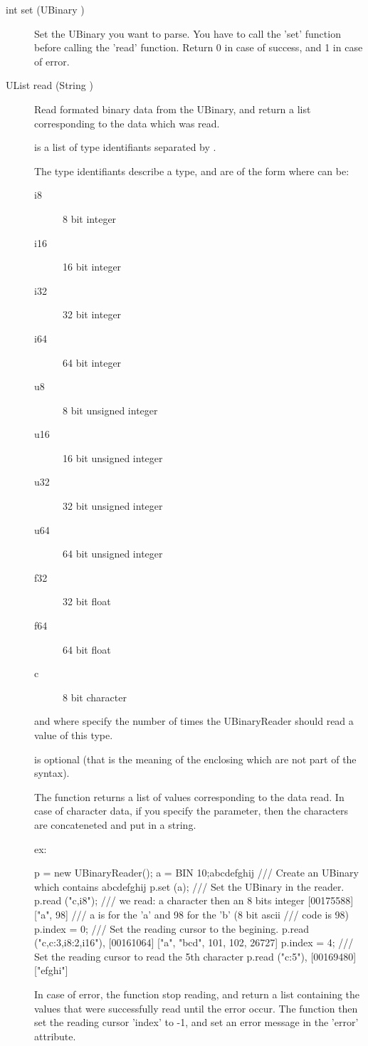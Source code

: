 \noindent
\begin{description}
\item[{int set (UBinary )}] Set the UBinary you want to
  parse. You have to call the 'set' function before calling the 'read'
  function.  Return 0 in case of success, and 1 in case of error.

\item[{UList read (String )}] Read formated binary data
  from the UBinary, and return a list corresponding to the data which
  was read.

   is a list of type identifiants separated by \samp{,}.

  The type identifiants describe a type, and are of the form
   where  can be:
  \begin{description}
  \item[i8]   8 bit integer
  \item[i16] 16 bit integer
  \item[i32] 32 bit integer
  \item[i64] 64 bit integer
  \item[u8]   8 bit unsigned integer
  \item[u16] 16 bit unsigned integer
  \item[u32] 32 bit unsigned integer
  \item[u64] 64 bit unsigned integer
  \item[f32] 32 bit float
  \item[f64] 64 bit float
  \item[c]    8 bit character
  \end{description}
  and where  specify the number of times the UBinaryReader
  should read a value of this type.

   is optional (that is the meaning of the enclosing \samp{[}
  \samp{]} which are not part of the syntax).

  The function returns a list of values corresponding to the data
  read.  In case of character data, if you specify the 
  parameter, then the characters are concateneted and put in a string.

  ex:
\begin{urbiunchecked}
p = new UBinaryReader();
a = BIN 10;abcdefghij   /// Create an UBinary which contains abcdefghij
p.set (a);              /// Set the UBinary in the reader.
p.read ("c,i8");        /// we read: a character then an 8 bits integer
[00175588] ["a", 98]    /// a is for the 'a' and 98 for the 'b' (8 bit ascii
                        /// code is 98)
p.index = 0;            /// Set the reading cursor to the begining.
p.read ("c,c:3,i8:2,i16"),
[00161064] ["a", "bcd", 101, 102, 26727]
p.index = 4;            /// Set the reading cursor to read the 5th character
p.read ("c:5"),
[00169480] ["efghi"]
\end{urbiunchecked}

  In case of error, the function stop reading, and return a list
  containing the values that were successfully read until the error
  occur. The function then set the reading cursor 'index' to -{}1, and
  set an error message in the 'error' attribute.
\end{description}

